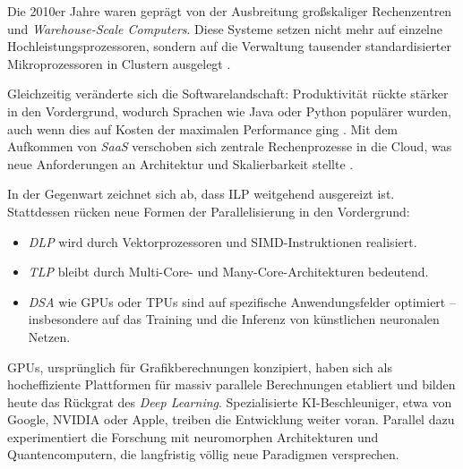 Die 2010er Jahre waren geprägt von der Ausbreitung großskaliger Rechenzentren und \textit{Warehouse-Scale Computers}. Diese Systeme setzen nicht mehr auf einzelne Hochleistungsprozessoren, sondern auf die Verwaltung tausender standardisierter Mikroprozessoren in Clustern ausgelegt \parencites[S.~6]{hennessy_computer_2011}[S.~158]{kanev_profiling_2015}[S.~29]{mars_heterogeneity_2011}.

Gleichzeitig veränderte sich die Softwarelandschaft: Produktivität rückte stärker in den Vordergrund, wodurch Sprachen wie Java oder Python populärer wurden, auch wenn dies auf Kosten der maximalen Performance ging \parencite[S.~2]{hennessy_computer_2011}. Mit dem Aufkommen von \textit{\ac{SaaS}} verschoben sich zentrale Rechenprozesse in die Cloud, was neue Anforderungen an Architektur und Skalierbarkeit stellte \parencites[S.~158]{kanev_profiling_2015}[S.~29]{mars_heterogeneity_2011}.

In der Gegenwart zeichnet sich ab, dass \ac{ILP} weitgehend ausgereizt ist. Stattdessen rücken neue Formen der Parallelisierung in den Vordergrund:

\begin{itemize}
    \item \textit{\ac{DLP}} wird durch Vektorprozessoren und \ac{SIMD}-Instruktionen realisiert.
    \item \textit{\ac{TLP}} bleibt durch Multi-Core- und Many-Core-Architekturen bedeutend.
    \item \textit{\ac{DSA}} wie GPUs oder \ac{TPU}s sind auf spezifische Anwendungsfelder optimiert – insbesondere auf das Training und die Inferenz von künstlichen neuronalen Netzen.
\end{itemize}

GPUs, ursprünglich für Grafikberechnungen konzipiert, haben sich als hocheffiziente Plattformen für massiv parallele Berechnungen etabliert und bilden heute das Rückgrat des \textit{Deep Learning}. Spezialisierte KI-Beschleuniger, etwa von Google, NVIDIA oder Apple, treiben die Entwicklung weiter voran. Parallel dazu experimentiert die Forschung mit neuromorphen Architekturen und Quantencomputern, die langfristig völlig neue Paradigmen versprechen.

